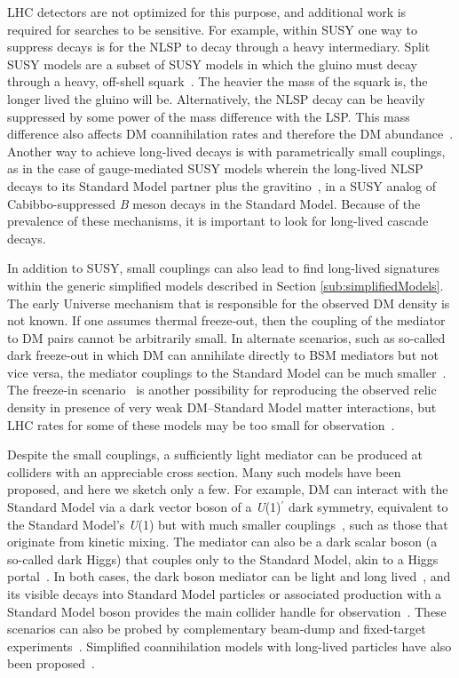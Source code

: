 \documentclass{ar-1col}
\begin{document}
{LHC detectors are not optimized for this purpose, and additional work is required
for searches to be sensitive. 
For example, within SUSY one way to suppress decays is for the NLSP to decay
through a heavy intermediary. Split SUSY models are a
subset of SUSY models in which the gluino must decay through a heavy,
off-shell squark~\cite{Masiero:2004ft}. The heavier the mass of
the squark is, the longer lived the gluino will be. Alternatively, the NLSP
decay can be heavily suppressed by some power of the mass
difference with the LSP. This mass difference also affects DM
coannihilation rates and therefore the DM
abundance~\cite{Ellis:1999mm}. Another way to achieve
long-lived decays is with parametrically small couplings, as in
the case of gauge-mediated SUSY models wherein the
long-lived NLSP decays to its Standard Model partner plus the
gravitino~\cite{Dimopoulos:1996vz}, in a SUSY analog of Cabibbo-suppressed \textit{B} meson decays in the Standard Model. Because of the prevalence of
these mechanisms, it is important to look for long-lived cascade
decays.

In addition to SUSY, small couplings can also lead to find long-lived signatures within the
generic simplified models described in Section \ref{sub:simplifiedModels}. 
The early Universe mechanism that is
responsible for the observed DM density is not known. 
If one assumes thermal freeze-out, then the
coupling of the mediator to DM pairs cannot be arbitrarily small. 
In alternate scenarios,
such as so-called dark freeze-out in which DM can annihilate directly to
BSM mediators but not vice versa, the mediator couplings to the Standard Model
can be much smaller~\cite{Pospelov:2007mp,Das:2010ts,Evans:2017kti}. 
The freeze-in
scenario~\cite{Co:2015pka,Bernal:2017kxu} is another possibility
for reproducing the observed relic density in presence of very weak DM--Standard Model matter interactions,
but LHC rates for some of these models may be too small for observation~\cite{Kahlhoefer:2018xxo}. 

Despite the small couplings, a
sufficiently light mediator can be produced at colliders with
an appreciable cross section. Many such models have been proposed, and here 
we sketch only a few.  
For example, DM can interact with the Standard Model via a dark
vector boson of a \textit{U}(1)$^{\prime}$ dark symmetry, equivalent to the Standard Model's \textit{U}(1)
but with much smaller couplings~\cite{Holdom:1985ag}, such as
those that originate from kinetic mixing. The mediator can also be a
dark scalar boson (a so-called dark Higgs) that couples only to the Standard Model,
akin to a Higgs portal~\cite{Curtin:2014cca}. In both cases, the
dark boson mediator can be light and
long lived~\cite{Pospelov:2007mp}, and its visible decays into Standard Model
particles or associated production with a Standard Model boson provides the
main collider handle for observation~\cite{Curtin:2014cca}. These
scenarios can also be probed by complementary beam-dump and fixed-target experiments~\cite{Battaglieri:2017aum}. Simplified
coannihilation models with long-lived particles have also been
proposed~\cite{ElHedri:2017nny}.


}
\end{document}
